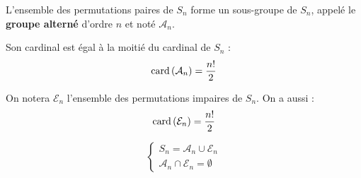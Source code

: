 \documentclass[12pt, a4paper]{report}
\begin{document}
\begin{property}
    L'ensemble des permutations paires de $S_n$ forme un sous-groupe de $S_n$, appelé le \textbf{groupe alterné} d'ordre $n$ et noté $\mathcal{A}_n$.

    Son cardinal est égal à la moitié du cardinal de $S_n$ :
    $$\mathrm{card}\left(\mathcal{A}_n\right) = \frac{n!}{2}$$

    On notera $\mathcal{E}_n$ l'ensemble des permutations impaires de $S_n$. On a aussi :
    $$\mathrm{card}\left(\mathcal{E}_n\right) = \frac{n!}{2}$$

    $$\begin{cases}
        S_n = \mathcal{A}_n \cup \mathcal{E}_n \\
        \mathcal{A}_n \cap \mathcal{E}_n = \emptyset
    \end{cases}$$
\end{property}
\end{document}
